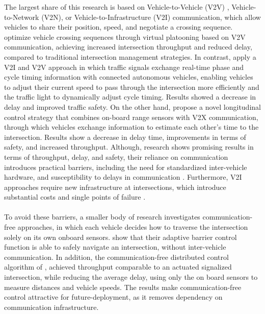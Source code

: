 The largest share of this research is based on Vehicle-to-Vehicle (V2V) , Vehicle-to-Network (V2N), or Vehicle-to-Infrastructure (V2I) communication, which allow vehicles to share their position, speed, and negotiate a crossing sequence. \textcite{el2026distributed} optimize vehicle crossing sequences through virtual platooning based on V2V communication, achieving increased intersection throughput and reduced delay, compared to traditional intersection management strategies. In contrast, \textcite{hasibur2021application} apply a V2I and V2V approach in which traffic signals exchange real-time phase and cycle timing information with connected autonomous vehicles, enabling vehicles to adjust their current speed to pass through the intersection more efficiently and the traffic light to dynamically adjust cycle timing. Results showed a decrease in delay and improved traffic safety. On the other hand, \textcite{bifulco2022decentralized} propose a novel longitudinal control strategy that combines on-board range sensors with V2X communication, through which vehicles exchange information to estimate each other's time to the intersection. Results show a decrease in delay time, improvements in terms of safety, and increased throughput. Although, research shows promising results in terms of throughput, delay, and safety, their reliance on communication introduces practical barriers, including the need for standardized inter-vehicle hardware, and susceptibility to delays in communication \parencite{soltani2025communication,el2026distributed}. Furthermore, V2I approaches require new infrastructure at intersections, which introduce substantial costs and single points of failure \parencite{soltani2025communication}.   
\\\\
To avoid these barriers, a smaller body of research investigates communication-free approaches, in which each vehicle decides how to traverse the intersection solely on its own onboard sensors. \textcite{song2025control} show that their adaptive barrier control function is able to safely navigate an intersection, without inter-vehicle communication.  In addition, the communication-free distributed control algorithm of \textcite{soltani2025communication}, achieved throughput comparable to an actuated signalized intersection, while reducing the average delay, using only the on board sensors to measure distances and vehicle speeds.
The results make communication-free control attractive for future-deployment, as it removes dependency on communication infrastructure.
\\\\
